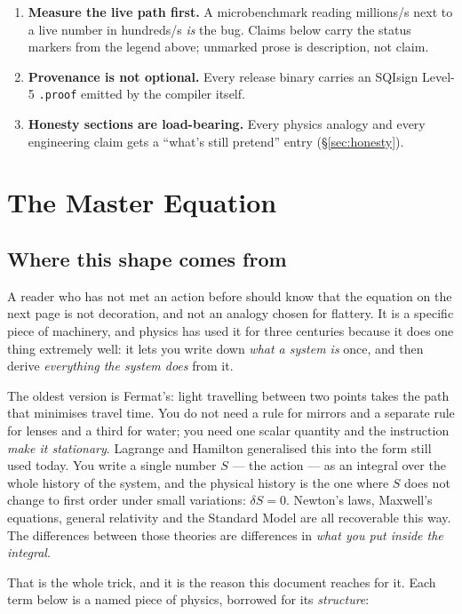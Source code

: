 \documentclass[10pt,a4paper]{article}
\begin{document}
\begin{enumerate}[leftmargin=1.5em,itemsep=2pt]
\item \textbf{Measure the live path first.} A microbenchmark reading millions/s next to
a live number in hundreds/s \emph{is} the bug. Claims below carry the status markers
from the legend above; unmarked prose is description, not claim.
\item \textbf{Provenance is not optional.} Every release binary carries an SQIsign
Level-5 \texttt{.proof} emitted by the compiler itself.
\item \textbf{Honesty sections are load-bearing.} Every physics analogy and every
engineering claim gets a ``what's still pretend'' entry (\S\ref{sec:honesty}).
\end{enumerate}

\section{The Master Equation}\label{sec:action}

\subsection{Where this shape comes from}\label{sec:action-primer}

A reader who has not met an action before should know that the equation on the next page
is not decoration, and not an analogy chosen for flattery. It is a specific piece of
machinery, and physics has used it for three centuries because it does one thing
extremely well: it lets you write down \emph{what a system is} once, and then derive
\emph{everything the system does} from it.

The oldest version is Fermat's: light travelling between two points takes the path that
minimises travel time. You do not need a rule for mirrors and a separate rule for lenses
and a third for water; you need one scalar quantity and the instruction \emph{make it
stationary}. Lagrange and Hamilton generalised this into the form still used today. You
write a single number $S$ — the action — as an integral over the whole history of the
system, and the physical history is the one where $S$ does not change to first order
under small variations: $\delta S = 0$. Newton's laws, Maxwell's equations, general
relativity and the Standard Model are all recoverable this way. The differences between
those theories are differences in \emph{what you put inside the integral}.

That is the whole trick, and it is the reason this document reaches for it. Each term
below is a named piece of physics, borrowed for its \emph{structure}:
\end{document}
